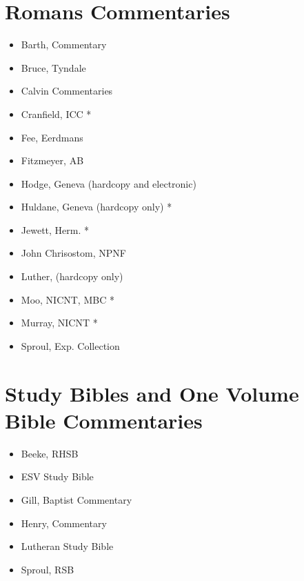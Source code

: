 \documentclass{article}
\begin{document}
\section{Romans Commentaries}
\begin{itemize}
  \item Barth, Commentary
  \item Bruce, Tyndale
  \item Calvin Commentaries
  \item Cranfield, ICC *
  \item Fee, Eerdmans
  \item Fitzmeyer, AB
  \item Hodge, Geneva (hardcopy and electronic)
  \item Huldane, Geneva (hardcopy only) *
  \item Jewett, Herm. *
  \item John Chrisostom, NPNF
  \item Luther, (hardcopy only)
  \item Moo, NICNT, MBC *
  \item Murray, NICNT *
  \item Sproul, Exp. Collection
\end{itemize}

\section{Study Bibles and One Volume Bible Commentaries}
\begin{itemize}
  \item Beeke, RHSB
  \item ESV Study Bible
  \item Gill, Baptist Commentary
  \item Henry, Commentary
  \item Lutheran Study Bible
  \item Sproul, RSB
\end{itemize}
\end{document}

